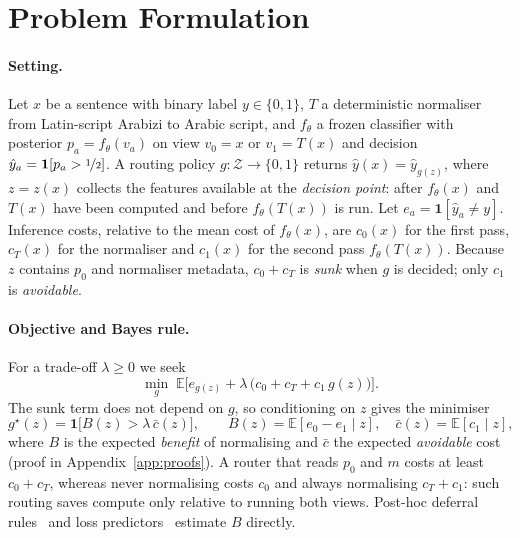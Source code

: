 \section{Problem Formulation}
\label{sec:formulation}

\paragraph{Setting.}
Let $x$ be a sentence with binary label $y\in\{0,1\}$, $T$ a deterministic normaliser from Latin-script Arabizi to Arabic script, and $f_\theta$ a frozen classifier with posterior $p_a=f_\theta(v_a)$ on view $v_0=x$ or $v_1=T(x)$ and decision $\hat y_a=\mathbf 1[p_a>\nicefrac12]$. A routing policy $g:\mathcal Z\to\{0,1\}$ returns $\hat y(x)=\hat y_{g(z)}$, where $z=z(x)$ collects the features available at the \emph{decision point}: after $f_\theta(x)$ and $T(x)$ have been computed and before $f_\theta(T(x))$ is run. Let $e_a=\mathbf 1[\hat y_a\neq y]$. Inference costs, relative to the mean cost of $f_\theta(x)$, are $c_0(x)$ for the first pass, $c_T(x)$ for the normaliser and $c_1(x)$ for the second pass $f_\theta(T(x))$. Because $z$ contains $p_0$ and normaliser metadata, $c_0+c_T$ is \emph{sunk} when $g$ is decided; only $c_1$ is \emph{avoidable}.

\paragraph{Objective and Bayes rule.}
For a trade-off $\lambda\ge0$ we seek
\begin{equation}
\min_g\;\mathbb E\big[e_{g(z)}+\lambda\,\big(c_0+c_T+c_1\,g(z)\big)\big].
\label{eq:risk}
\end{equation}
The sunk term does not depend on $g$, so conditioning on $z$ gives the minimiser
\begin{equation}
g^\star(z)=\mathbf 1\big[B(z)>\lambda\,\bar c(z)\big],\qquad B(z)=\mathbb E[e_0-e_1\mid z],\quad \bar c(z)=\mathbb E[c_1\mid z],
\label{eq:bayes}
\end{equation}
where $B$ is the expected \emph{benefit} of normalising and $\bar c$ the expected \emph{avoidable} cost (proof in Appendix~\ref{app:proofs}). A router that reads $p_0$ and $m$ costs at least $c_0+c_T$, whereas never normalising costs $c_0$ and always normalising $c_T+c_1$: such routing saves compute only relative to running both views. Post-hoc deferral rules~\cite{jitkrittum2023cascade} and loss predictors~\cite{kim2020learningloss} estimate $B$ directly.

